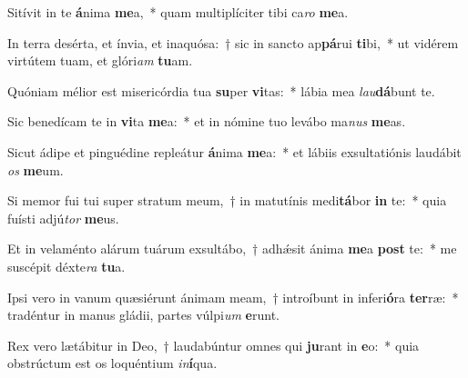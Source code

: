 \item Sitívit in te \textbf{á}nima \textbf{me}a,~* quam multiplíciter tibi ca\textit{ro} \textbf{me}a.
\item In terra desérta, et ínvia, et inaquósa:~† sic in sancto ap\textbf{pá}rui \textbf{ti}bi,~* ut vidérem virtútem tuam, et glóri\textit{am} \textbf{tu}am.
\item Quóniam mélior est misericórdia tua \textbf{su}per \textbf{vi}tas:~* lábia mea \textit{lau}\textbf{dá}bunt te.
\item Sic benedícam te in \textbf{vi}ta \textbf{me}a:~* et in nómine tuo levábo ma\textit{nus} \textbf{me}as.
\item Sicut ádipe et pinguédine repleátur \textbf{á}nima \textbf{me}a:~* et lábiis exsultatiónis laudábit \textit{os} \textbf{me}um.
\item Si memor fui tui super stratum meum,~† in matutínis medi\textbf{tá}bor \textbf{in} te:~* quia fuísti adjú\textit{tor} \textbf{me}us.
\item Et in velaménto alárum tuárum exsultábo,~† adhǽsit ánima \textbf{me}a \textbf{post} te:~* me suscépit déxte\textit{ra} \textbf{tu}a.
\item Ipsi vero in vanum quæsiérunt ánimam meam,~† introíbunt in inferi\textbf{ó}ra \textbf{ter}ræ:~* tradéntur in manus gládii, partes vúlpi\textit{um} \textbf{e}runt.
\item Rex vero lætábitur in Deo,~† laudabúntur omnes qui \textbf{ju}rant in \textbf{e}o:~* quia obstrúctum est os loquéntium \textit{in}\textbf{í}qua.
